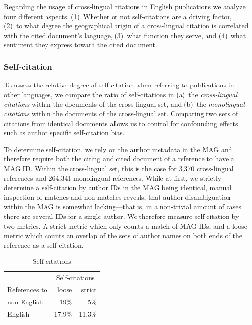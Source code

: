 Regarding the usage of cross-lingual citations in English publications we analyze four different aspects. (1)~Whether or not self-citations are a driving factor, (2)~to what degree the geographical origin of a cross-lingual citation is correlated with the cited document's language, (3)~what function they serve, and (4)~what sentiment they express toward the cited document.

\subsubsection{Self-citation}\label{sec:selfcit}

To assess the relative degree of self-citation when referring to publications in other languages, we compare the ratio of self-citations in (a)~the \emph{cross-lingual citations} within the documents of the cross-lingual set, and (b)~the \emph{monolingual citations} within the documents of the cross-lingual set. Comparing two sets of citations from identical documents allows us to control for confounding effects such as author specific self-citation bias.

To determine self-citation, we rely on the author metadata in the MAG and therefore require both the citing and cited document of a reference to have a MAG ID. Within the cross-lingual set, this is the case for 3,370 cross-lingual references and 264,341 monolingual references. While at first, we strictly determine a self-citation by author IDs in the MAG being identical, manual inspection of matches and non-matches reveals, that author disambiguation within the MAG is somewhat lacking---that is, in a non-trivial amount of cases there are several IDs for a single author. We therefore measure self-citation by two metrics. A strict metric which only counts a match of MAG IDs, and a loose metric which counts an overlap of the sets of author names on both ends of the reference as a self-citation.

\begin{table}[tb]
\caption{Self-citations}
 \label{tab:selfcit}
  \centering
  \begin{small}
 \begin{threeparttable}
 \begin{tabular}{lrr}
 \toprule
   \ & \multicolumn{2}{c}{Self-citations} \\
   References to & loose & strict \\
   \midrule
   non-English & 19\% & 5\% \\
   English & 17.9\% & 11.3\% \\
   \bottomrule
 \end{tabular}
\end{threeparttable}
  \end{small}
\end{table}

